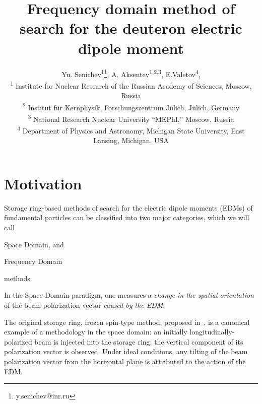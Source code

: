 \documentclass[a4paper]{jacow}
\begin{document}
\title{Frequency domain method of search for the deuteron electric dipole moment}

\author{Yu. Senichev\textsuperscript{1}\thanks{y.senichev@inr.ru},
  A. Aksentev\textsuperscript{1,2,3},
  E.Valetov\textsuperscript{4}, \\
  \textsuperscript{1} Institute for Nuclear Research of the Russian Academy of Sciences, Moscow, Russia\\
  \textsuperscript{2} Institut f\"ur Kernphysik, Forschungszentrum J\"ulich, J\"ulich, Germany\\
  \textsuperscript{3} National Research Nuclear University ``MEPhI,'' Moscow, Russia\\
  \textsuperscript{4} Department of Physics and Astronomy, Michigan State University, East Lansing, Michigan, USA}

\maketitle

\tableofcontents


\section{Motivation}

Storage ring-based methods of search for the electric dipole moments (EDMs) of fundamental particles
can be classified into two major categories, which we will call
\begin{inparaenum}
\item Space Domain, and %
\item Frequency Domain %
\end{inparaenum}
methods.

In the Space Domain paradigm, one measures a \emph{change in the spatial orientation} of the beam polarization
vector \emph{caused by the EDM}.

The original storage ring, frozen spin-type method, proposed in~\cite{BNL:Deuteron2008}, is a canonical example of
a methodology in the space domain: an initially longitudinally-polarized beam is injected into the storage ring;
the vertical component of its polarization vector is observed. Under ideal conditions, any tilting of
the beam polarization vector from the horizontal plane is attributed to the action of the EDM.
\end{document}
